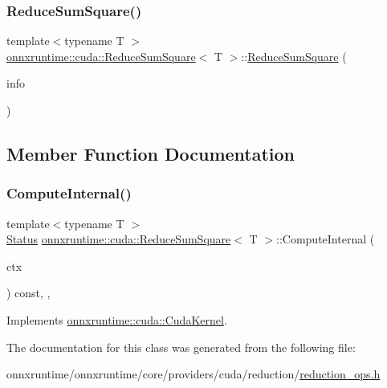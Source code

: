 \subsubsection{\texorpdfstring{Reduce\+Sum\+Square()}{ReduceSumSquare()}}
{\footnotesize\ttfamily template$<$typename T $>$ \\
\mbox{\hyperlink{classonnxruntime_1_1cuda_1_1ReduceSumSquare}{onnxruntime\+::cuda\+::\+Reduce\+Sum\+Square}}$<$ T $>$\+::\mbox{\hyperlink{classonnxruntime_1_1cuda_1_1ReduceSumSquare}{Reduce\+Sum\+Square}} (\begin{DoxyParamCaption}\item[{const \mbox{\hyperlink{classonnxruntime_1_1OpKernelInfo}{Op\+Kernel\+Info}} \&}]{info }\end{DoxyParamCaption})\hspace{0.3cm}{\ttfamily [inline]}}



\subsection{Member Function Documentation}
\mbox{\label{classonnxruntime_1_1cuda_1_1ReduceSumSquare_ab6630541532a2665c0144113198c0c60}} 
\subsubsection{\texorpdfstring{Compute\+Internal()}{ComputeInternal()}}
{\footnotesize\ttfamily template$<$typename T $>$ \\
\mbox{\hyperlink{classonnxruntime_1_1common_1_1Status}{Status}} \mbox{\hyperlink{classonnxruntime_1_1cuda_1_1ReduceSumSquare}{onnxruntime\+::cuda\+::\+Reduce\+Sum\+Square}}$<$ T $>$\+::Compute\+Internal (\begin{DoxyParamCaption}\item[{\mbox{\hyperlink{classonnxruntime_1_1OpKernelContext}{Op\+Kernel\+Context}} $\ast$}]{ctx }\end{DoxyParamCaption}) const\hspace{0.3cm}{\ttfamily [inline]}, {\ttfamily [override]}, {\ttfamily [virtual]}}



Implements \mbox{\hyperlink{classonnxruntime_1_1cuda_1_1CudaKernel_aca7af04ae448017d6023d30bba231ebb}{onnxruntime\+::cuda\+::\+Cuda\+Kernel}}.



The documentation for this class was generated from the following file\+:\begin{DoxyCompactItemize}
\item 
onnxruntime/onnxruntime/core/providers/cuda/reduction/\mbox{\hyperlink{cuda_2reduction_2reduction__ops_8h}{reduction\+\_\+ops.\+h}}\end{DoxyCompactItemize}
